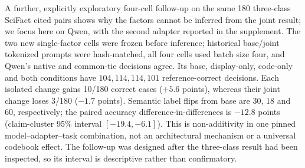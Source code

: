 A further, explicitly exploratory four-cell follow-up on the same 180 three-class SciFact cited pairs shows why the factors cannot be inferred from the joint result; we focus here on Qwen, with the second adapter reported in the supplement. The two new single-factor cells were frozen before inference; historical base/joint tokenized prompts were hash-matched, all four cells used batch size four, and Qwen's native and common-tie decisions agree. Its base, display-only, code-only and both conditions have $104,114,114,101$ reference-correct decisions. Each isolated change gains 10/180 correct cases ($+5.6$ points), whereas their joint change loses 3/180 ($-1.7$ points). Semantic label flips from base are 30, 18 and 60, respectively; the paired accuracy difference-in-differences is $-12.8$ points (claim-cluster 95\% interval $[-19.4,-6.1]$). This is non-additivity in one pinned model--adapter--task combination, not an architectural mechanism or a universal codebook effect. The follow-up was designed after the three-class result had been inspected, so its interval is descriptive rather than confirmatory.
